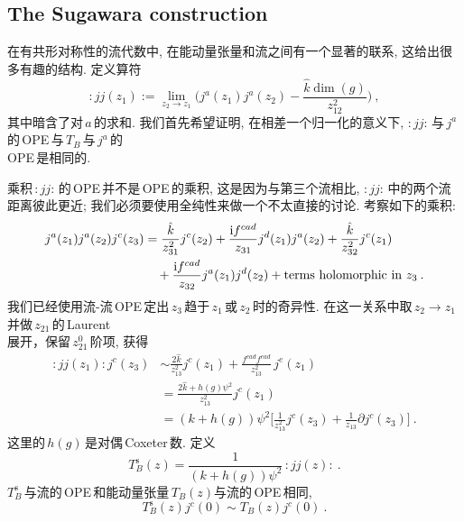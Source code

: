\subsection*{The Sugawara construction}

在有共形对称性的流代数中, 在能动量张量和流之间有一个显著的联系, 这给出很多有趣的结构. 定义算符
\begin{equation}
    :jj(z_{1}):=\lim_{z_{2}\to z_{1}}\Biggl(j^{a}(z_{1})j^{a}(z_{2})-\frac{\hat{k}\operatorname{dim}(g)}{z_{12}^{2}}\Biggr) \:, \label{11.5.18}
\end{equation}
其中暗含了对$\,a\,$的求和. 我们首先希望证明, 在相差一个归一化的意义下, $:jj:\,$与$\,j^{a}\,$的\,OPE\,与$\,T_{B}\,$与$\,j^{a}\,$的\\OPE\,是相同的. 

乘积$\,:jj:\,$的\,OPE\,并不是\,OPE\,的乘积, 这是因为与第三个流相比, $:jj:\,$中的两个流距离彼此更近; 我们必须要使用全纯性来做一个不太直接的讨论. 考察如下的乘积:
\begin{align}
    j^{a}(z_{1})j^{a}(z_{2})j^{c}(z_{3})&=\frac{\hat{k}}{z_{31}^{2}}j^{c}(z_{2})+\frac{\mathrm{i} f^{cad}}{z_{31}}j^{d}(z_{1})j^{a}(z_{2})+\frac{\hat{k}}{z_{32}^{2}}j^{c}(z_{1}) \nonumber \\
    &\quad +\frac{\mathrm{i} f^{cad}}{z_{32}}j^{a}(z_{1})j^{d}(z_{2})+ \text{terms holomorphic in } z_{3} \:. \label{11.5.19}
\end{align}
我们已经使用流-流\,OPE\,定出$\,z_{3}\,$趋于$\,z_{1}\,$或$\,z_{2}\,$时的奇异性. 在这一关系中取$\,z_{2}\to z_{1}\,$并做$\,z_{21}\,$的\,Laurent\,\\展开，保留$\,z_{21}^{0}\,$阶项, 获得
\begin{align}
    :jj(z_{1}):j^{c}(z_{3}) &\sim \frac{2\hat{k}}{z_{13}^{2}}j^{c}(z_{1})+\frac{f^{cad}f^{ead}}{z_{13}^{2}}\,j^{e}(z_{1}) \nonumber\\
    &=\frac{2\hat{k}+h(g)\psi^{2}}{z_{13}^{2}}j^{c}(z_{1}) \nonumber \\
    &=(k+h(g))\psi^{2}\biggl[\frac{1}{z_{13}^{2}}j^{c}(z_{3})+\frac{1}{z_{13}}\partial j^{c}(z_{3})\biggr] \:. \label{11.5.20}
\end{align}
这里的$\,h(g)\,$是对偶\,Coxeter\,数. 定义
\begin{equation}
    T_{B}^{\mathrm{s}}(z) =\frac{1}{(k+h(g))\psi^{2}}\,:jj(z):\:. \label{11.5.21}
\end{equation}
$T_{B}^{\mathrm{s}}\,$与流的\,OPE\,和能动量张量$\,T_{B}(z)$与流的\,OPE\,相同,
\begin{equation}
    T_{B}^{\mathrm{s}}(z)j^{c}(0)\sim
    T_{B}(z)j^{c}(0) \:. \label{11.5.22}
\end{equation}

